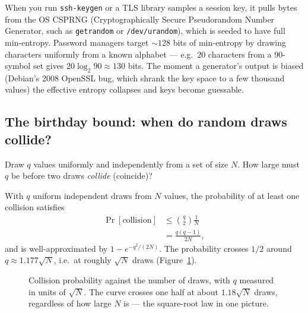 \begin{applicationbox}
When you run \texttt{ssh-keygen} or a TLS library samples a session key, it pulls
bytes from the OS CSPRNG (Cryptographically Secure Pseudorandom Number Generator, such as \texttt{getrandom} or \texttt{/dev/urandom}), which is
seeded to have full min-entropy. Password managers target $\sim 128$ bits of
min-entropy by drawing characters uniformly from a known alphabet --- e.g.\
$20$ characters from a $90$-symbol set gives $20\log_2 90 \approx 130$ bits. The
moment a generator's output is biased (Debian's 2008 OpenSSL bug, which shrank the
key space to a few thousand values) the effective entropy collapses and keys become
guessable.
\end{applicationbox}

\subsection{The birthday bound: when do random draws collide?}
\label{ch41:birthday}

Draw $q$ values uniformly
and independently from a set of size $N$. How large must $q$ be before two draws
\emph{collide} (coincide)?

\begin{theorem}
\label{ch41:thm-birthday}
With $q$ uniform independent draws from $N$ values, the probability of at least one
collision satisfies
\begin{align*}
\Pr[\text{collision}] &\le \binom{q}{2}\frac{1}{N} \\
                      &= \frac{q(q-1)}{2N},
\end{align*}
and is well-approximated by $1-e^{-q^2/(2N)}$. The probability crosses $1/2$ around
$q \approx 1.177\sqrt{N}$, i.e.\ at roughly $\sqrt{N}$ draws
(Figure~\ref{ch41:fig-birthday}).
\end{theorem}

\begin{figure}[H]
\centering
{}
\caption{Collision probability against the number of draws, with $q$ measured in
units of $\sqrt{N}$. The curve crosses one half at about $1.18\sqrt{N}$ draws,
regardless of how large $N$ is --- the square-root law in one picture.}
\label{ch41:fig-birthday}
\end{figure}

